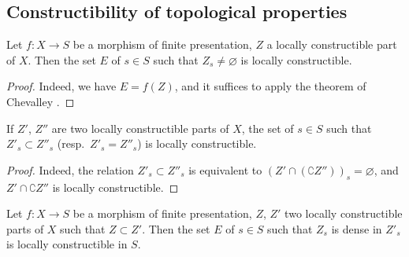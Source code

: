 \subsection{Constructibility of topological properties}
\label{subsection:IV.9.5}

\begin{proposition}[9.5.1]
\label{IV.9.5.1}
Let $f:X\to S$ be a morphism of finite presentation, $Z$ a locally constructible part of $X$.
Then the set $E$ of $s\in S$ such that $Z_s\neq\varnothing$ is locally constructible.
\end{proposition}

\begin{proof}
Indeed, we have $E=f(Z)$, and it suffices to apply the theorem of Chevalley .
\end{proof}

\begin{corollary}[9.5.2]
\label{IV.9.5.2}
If $Z'$, $Z''$ are two locally constructible parts of $X$, the set of $s\in S$ such that $Z'_s\subset Z''_s$ (resp.\ $Z'_s=Z''_s$) is locally constructible.
\end{corollary}

\begin{proof}
Indeed, the relation $Z'_s\subset Z''_s$ is equivalent to $(Z'\cap(\complement Z''))_s=\varnothing$, and $Z'\cap\complement Z''$ is locally constructible.
\end{proof}

\begin{proposition}[9.5.3]
\label{IV.9.5.3}
Let $f:X\to S$ be a morphism of finite presentation, $Z$, $Z'$ two locally constructible parts of $X$ such that $Z\subset Z'$.
Then the set $E$ of $s\in S$ such that $Z_s$ is dense in $Z'_s$ is locally constructible in $S$.
\end{proposition}

